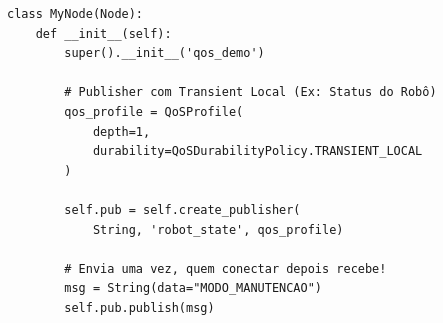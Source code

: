 \documentclass[preview,border=2pt]{standalone}
\begin{document}
\begin{lstlisting}[style=pythonstyle]
class MyNode(Node):
    def __init__(self):
        super().__init__('qos_demo')
        
        # Publisher com Transient Local (Ex: Status do Robô)
        qos_profile = QoSProfile(
            depth=1,
            durability=QoSDurabilityPolicy.TRANSIENT_LOCAL
        )
        
        self.pub = self.create_publisher(
            String, 'robot_state', qos_profile)
            
        # Envia uma vez, quem conectar depois recebe!
        msg = String(data="MODO_MANUTENCAO")
        self.pub.publish(msg)
\end{lstlisting}
\end{document}
